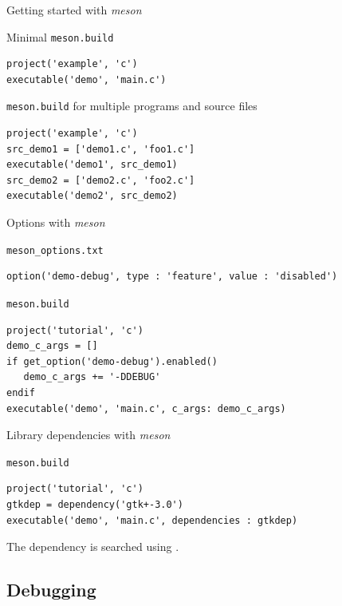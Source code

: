 \begin{frame}[fragile]{Getting started with {\em meson}}
  \begin{block}{Minimal {\tt meson.build}}
\begin{verbatim}
project('example', 'c')
executable('demo', 'main.c')
\end{verbatim}
  \end{block}

  \begin{block}{{\tt meson.build} for multiple programs and source files}
\begin{verbatim}
project('example', 'c')
src_demo1 = ['demo1.c', 'foo1.c']
executable('demo1', src_demo1)
src_demo2 = ['demo2.c', 'foo2.c']
executable('demo2', src_demo2)
\end{verbatim}
  \end{block}
\end{frame}

\begin{frame}[fragile]{Options with {\em meson}}
  \begin{block}{{\tt meson\_options.txt}}
\begin{verbatim}
option('demo-debug', type : 'feature', value : 'disabled')
\end{verbatim}
  \end{block}

  \begin{block}{{\tt meson.build}}
\begin{verbatim}
project('tutorial', 'c')
demo_c_args = []
if get_option('demo-debug').enabled()
   demo_c_args += '-DDEBUG'
endif
executable('demo', 'main.c', c_args: demo_c_args)
\end{verbatim}
  \end{block}
\end{frame}

\begin{frame}[fragile]{Library dependencies with {\em meson}}
  \begin{block}{{\tt meson.build}}
\begin{verbatim}
project('tutorial', 'c')
gtkdep = dependency('gtk+-3.0')
executable('demo', 'main.c', dependencies : gtkdep)
\end{verbatim}
  \end{block}
  The dependency  is searched using .
\end{frame}

\subsection{Debugging}


